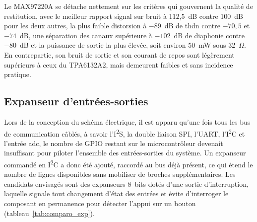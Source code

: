 Le MAX97220A se détache nettement sur les critères qui gouvernent la qualité de restitution, avec le meilleur rapport signal sur bruit à 112,5~dB contre 100~dB pour les deux autres, la plus faible distorsion à $-89$~dB de \gls{thdn} contre $-70{,}5$ et $-74$~dB, une séparation des canaux supérieure à $-102$~dB de diaphonie contre $-80$~dB et la puissance de sortie la plus élevée, soit environ 50~mW sous 32~$\Omega$. En contrepartie, son bruit de sortie et son courant de repos sont légèrement supérieurs à ceux du TPA6132A2, mais demeurent faibles et sans incidence pratique.






\subsection{Expanseur d'entrées-sorties}

Lors de la conception du schéma électrique, il est apparu qu'une fois tous les bus de communication câblés, à savoir l'I\textsuperscript{2}S, la double liaison SPI, l'UART, l'I\textsuperscript{2}C et l'entrée \gls{adc}, le nombre de GPIO restant sur le microcontrôleur devenait insuffisant pour piloter l'ensemble des entrées-sorties du système. Un expanseur commandé en I\textsuperscript{2}C a donc été ajouté, raccordé au bus déjà présent, ce qui étend le nombre de lignes disponibles sans mobiliser de broches supplémentaires. Les candidats envisagés sont des expanseurs 8~bits dotés d'une sortie d'interruption, laquelle signale tout changement d'état des entrées et évite d'interroger le composant en permanence pour détecter l'appui sur un bouton (tableau~\ref{tab:comparo_exp}).

